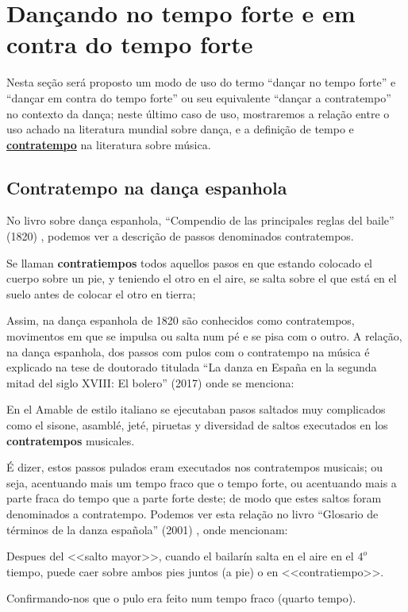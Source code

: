 \newpage
\section{Dançando no tempo forte e em contra do tempo forte}

Nesta seção será proposto um modo de uso do termo
``dançar no tempo forte'' e
``dançar em contra do tempo forte'' ou seu equivalente 
``dançar a contratempo'' no contexto da dança;
neste último caso de uso, mostraremos a relação entre o uso achado na literatura mundial sobre dança,
e a definição de tempo e \hyperref[sec:contratempo]{\textbf{contratempo}} na literatura sobre música.

\subsection{Contratempo na dança espanhola}
\label{subsec:contratempoespanha}
No livro sobre dança espanhola, ``Compendio de las principales reglas del baile'' (1820) \cite[pp. 131]{cairon1820compendio},
podemos ver a descrição de passos denominados contratempos.
\begin{citando}
Se llaman \textbf{contratiempos} todos aquellos pasos en que estando colocado el cuerpo sobre un pie,
y teniendo el otro en el aire,
se salta sobre el que está en el suelo antes de colocar el otro en tierra;
\end{citando}
Assim, na dança espanhola de 1820 são conhecidos como contratempos,
movimentos em que se impulsa ou salta num pé e se pisa com o outro. 
A relação, na dança espanhola,  dos passos com pulos
com o contratempo na música 
é explicado na tese de doutorado titulada 
``La danza en España en la segunda mitad del siglo XVIII: El bolero'' (2017)
\cite[pp. 160]{martin2017danza} onde se menciona:
\begin{citando}
En el Amable de estilo italiano se ejecutaban pasos saltados muy complicados como el sisone,
asamblé, jeté, piruetas y diversidad de saltos executados en los \textbf{contratempos} musicales.
\end{citando}
É dizer, estos passos pulados eram executados nos contratempos musicais;
ou seja, acentuando mais um tempo fraco que o tempo forte,
ou acentuando mais a parte fraca do tempo que a parte forte deste;
de modo que estes saltos foram denominados a contratempo.
Podemos ver esta relação no livro ``Glosario de términos de la danza española'' (2001)
\cite[pp. 109]{aubero2001glosario}, onde mencionam:
\begin{citando}
Despues del <<salto mayor>>, cuando el bailarín salta en el aire en el $4^o$ tiempo,
puede caer sobre ambos pies juntos (a pie) o en <<contratiempo>>.
\end{citando}
Confirmando-nos que o pulo era feito num tempo fraco (quarto tempo).



